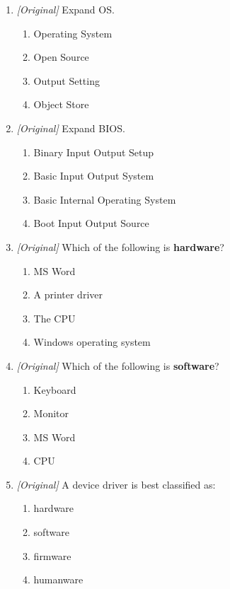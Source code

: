 \begin{enumerate}[label=\textbf{Q\arabic*.}, leftmargin=*]
\item \textit{[Original]} Expand OS.
  \begin{enumerate}[label=\Alph*.]
    \item Operating System
    \item Open Source
    \item Output Setting
    \item Object Store
  \end{enumerate}
\item \textit{[Original]} Expand BIOS.
  \begin{enumerate}[label=\Alph*.]
    \item Binary Input Output Setup
    \item Basic Input Output System
    \item Basic Internal Operating System
    \item Boot Input Output Source
  \end{enumerate}
\item \textit{[Original]} Which of the following is \textbf{hardware}?
  \begin{enumerate}[label=\Alph*.]
    \item MS Word
    \item A printer driver
    \item The CPU
    \item Windows operating system
  \end{enumerate}
\item \textit{[Original]} Which of the following is \textbf{software}?
  \begin{enumerate}[label=\Alph*.]
    \item Keyboard
    \item Monitor
    \item MS Word
    \item CPU
  \end{enumerate}
\item \textit{[Original]} A device driver is best classified as:
  \begin{enumerate}[label=\Alph*.]
    \item hardware
    \item software
    \item firmware
    \item humanware
  \end{enumerate}

\end{enumerate}
